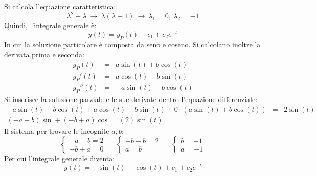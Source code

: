 \documentclass[a4paper]{article}
\begin{document}
	\noindent
	Si calcola l'equazione caratteristica:
	\begin{equation*}
		\lambda^{2} + \lambda \: \rightarrow \: \lambda\left(\lambda + 1\right) \: \rightarrow \: \lambda_{1} = 0, \: \lambda_{2} = -1
	\end{equation*}
	Quindi, l'integrale generale è:
	\begin{equation*}
		y\left(t\right) = y_{P}\left(t\right) + c_{1} + c_{2}e^{-t}
	\end{equation*}
	In cui la soluzione particolare è composta da seno e coseno. Si calcolano inoltre la derivata prima e seconda:
	\begin{equation*}
		\begin{array}{rcl}
			y_{P}\left(t\right)		&=& a\sin\left(t\right) + b\cos\left(t\right) \\ [.3em]
			y_{P}'\left(t\right) 	&=& a\cos\left(t\right) - b\sin\left(t\right) \\ [.3em]
			y_{P}''\left(t\right)	&=& -a\sin\left(t\right) - b\cos\left(t\right)
		\end{array}
	\end{equation*}
	Si inserisce la soluzione parziale e le sue derivate dentro l'equazione differenziale:
	\begin{equation*}
		\begin{array}{rcl}
			-a\sin\left(t\right) - b\cos\left(t\right) + a\cos\left(t\right) - b\sin\left(t\right) + 0 \cdot \left(a\sin\left(t\right) + b\cos\left(t\right)\right) &=& 2\sin\left(t\right) \\ [.5em]
			\left(-a- b\right)\sin + \left(- b+ a\right)\cos = \left(2\right)\sin\left(t\right)
		\end{array}
	\end{equation*}
	Il sistema per trovare le incognite $a,b$:
	\begin{equation*}
		\begin{cases}
			-a-b = 2 \\
			-b+a = 0
		\end{cases}
		=
		\begin{cases}
			-b-b = 2 \\
			a = b
		\end{cases}
		=
		\begin{cases}
			b = -1 \\
			a = -1
		\end{cases}
	\end{equation*}
	Per cui l'integrale generale diventa:
	\begin{equation*}
		y\left(t\right) = -\sin\left(t\right) - \cos\left(t\right) + c_{1} + c_{2}e^{-t}
	\end{equation*}
\end{document}
